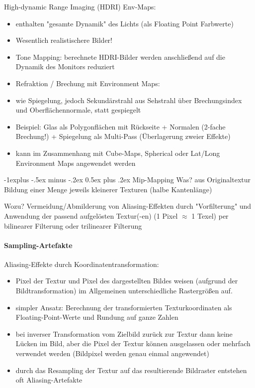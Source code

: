 \documentclass[10pt,landscape]{article}
\makeatletter
\renewcommand{\subsection}{\@startsection{subsection}{2}{0mm}%
                                {-1explus -.5ex minus -.2ex}%
                                {0.5ex plus .2ex}%
                                {\normalfont\normalsize\bfseries}}
\makeatother
\begin{document}
\begin{multicols}{3}
High-dynamic Range Imaging (HDRI) Env-Maps:
\begin{itemize}
  \item enthalten "gesamte Dynamik" des Lichts (als Floating Point Farbwerte)
  \item Wesentlich realistischere Bilder!
  \item Tone Mapping: berechnete HDRI-Bilder werden anschließend auf die Dynamik des Monitors reduziert
  \item Refraktion / Brechung mit Environment Maps:
  \item wie Spiegelung, jedoch Sekundärstrahl aus Sehstrahl über Brechungsindex und Oberflächennormale, statt gespiegelt
  \item Beispiel: Glas als Polygonflächen mit Rückseite + Normalen (2-fache Brechung!) + Spiegelung als Multi-Pass (Überlagerung zweier Effekte)
  \item kann im Zusammenhang mit Cube-Maps, Spherical oder Lat/Long Environment Maps angewendet werden
\end{itemize}


\subsection{ Mip-Mapping}
Was? aus Originaltextur Bildung einer Menge jeweils kleinerer Texturen (halbe Kantenlänge)

Wozu? Vermeidung/Abmilderung von Aliasing-Effekten durch "Vorfilterung" und Anwendung der passend aufgelösten Textur(-en) (1 Pixel $\approx$ 1 Texel) per bilinearer Filterung oder trilinearer Filterung

\paragraph{Sampling-Artefakte}
Aliasing-Effekte durch Koordinatentransformation:
\begin{itemize}
  \item Pixel der Textur und Pixel des dargestellten Bildes weisen (aufgrund der Bildtransformation) im Allgemeinen unterschiedliche Rastergrößen auf.
  \item simpler Ansatz: Berechnung der transformierten Texturkoordinaten als Floating-Point-Werte und Rundung auf ganze Zahlen
  \item bei inverser Transformation vom Zielbild zurück zur Textur dann keine Lücken im Bild, aber die Pixel der Textur können ausgelassen oder mehrfach verwendet werden (Bildpixel werden genau einmal angewendet)
  \item durch das Resampling der Textur auf das resultierende Bildraster entstehen oft Aliasing-Artefakte
\end{itemize}


\end{multicols}
\end{document}
